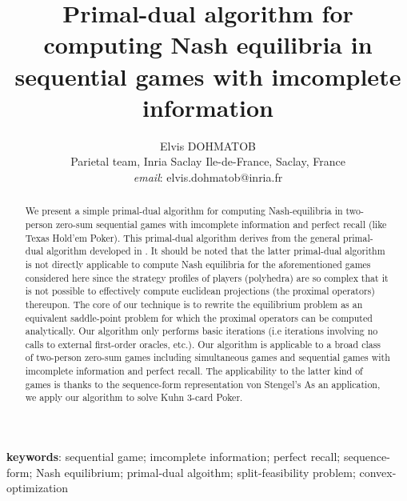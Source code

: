 \documentclass{article} %
\author{
Elvis DOHMATOB
\\
Parietal team, Inria Saclay Ile-de-France, Saclay, France\\
\textit{email}: elvis.dohmatob@inria.fr}
\title{\bf Primal-dual algorithm for computing Nash equilibria in
sequential games with imcomplete information
}
\begin{document}
\maketitle

\begin{abstract}
We present a simple primal-dual algorithm
for computing Nash-equilibria in two-person zero-sum sequential games
with imcomplete information and perfect recall (like Texas Hold'em
Poker). This primal-dual algorithm derives from the general
primal-dual algorithm developed
in \cite{chambolle2010,chambolle2014ergodic}. It should be noted that
the latter primal-dual algorithm is not directly applicable to compute
Nash equilibria for the aforementioned games considered here since the
strategy profiles of players (polyhedra) are so complex that it is not
possible
 to effectively compute %
euclidean
 projections (the proximal operators) thereupon.
The core of our technique is to rewrite the equilibrium problem as an
equivalent saddle-point problem for which the proximal operators can
be computed analytically.
Our algorithm only performs basic iterations
(i.e iterations involving no
calls to external first-order oracles, etc.).
Our algorithm is applicable to a broad class of two-person zero-sum
games including simultaneous games and sequential games with
imcomplete information and perfect recall. The applicability to the
latter kind of games is thanks to the sequence-form representation von
Stengel's \cite{von1996efficient}
As an application, we apply our algorithm to solve Kuhn 3-card Poker.
\end{abstract}

\textbf{keywords}: sequential game; imcomplete information; perfect
recall; sequence-form; Nash equilibrium; primal-dual algoithm;
split-feasibility problem; convex-optimization
\end{document}

